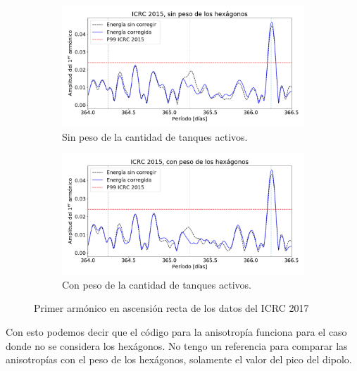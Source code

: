         \begin{figure}[H]
        
          \begin{subfigure}[b]{\textwidth}
          \centering
            \includegraphics[width=\textwidth]{../0_Introduccion/ICRC/ICRC2017_Ecor_Eraw.png}
            \caption{Sin peso de la cantidad de tanques activos. }  \label{fig:8EeV_sin_peso_ICRC2017_raw}
          \end{subfigure}%
        
          \begin{subfigure}[b]{\textwidth}
          \centering
            \includegraphics[width=\textwidth]{../0_Introduccion/ICRC/ICRC2017_Ecor_Eraw_hex.png}
            \caption{Con peso de la cantidad de tanques activos. }  \label{fig:8EeV_sin_peso_ICRC2017_cor}
          \end{subfigure}
          \caption{Primer armónico en ascensión recta de los datos del ICRC 2017}
        \end{figure}

      Con esto podemos decir que el código para la anisotropía funciona para el caso donde no se considera los hexágonos. No tengo un referencia para comparar las anisotropías con el peso de los hexágonos, solamente el valor del pico del dipolo.

